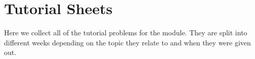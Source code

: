 \chapter{Tutorial Sheets}
\label{sec: tutorial sheets}

Here we collect all of the tutorial problems for the module. They are split into different weeks depending on the topic they relate to and when they were given out.